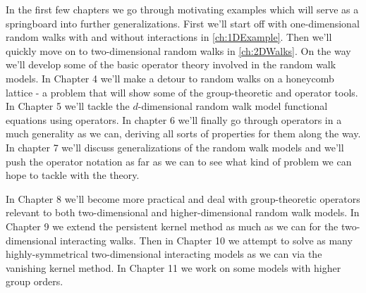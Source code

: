 In the first few chapters we go through motivating examples which will serve as a springboard into further generalizations. First we'll start off with one-dimensional random walks with and without interactions in \autoref{ch:1DExample}. Then we'll quickly move on to two-dimensional random walks in \autoref{ch:2DWalks}. On the way we'll develop some of the basic operator theory involved in the random walk models. In Chapter 4 we'll make a detour to random walks on a honeycomb lattice - a problem that will show some of the group-theoretic and operator tools. In Chapter 5 we'll tackle the $d$-dimensional random walk model functional equations using operators. In chapter 6 we'll finally go through operators in a much generality as we can, deriving all sorts of properties for them along the way. In chapter 7 we'll discuss generalizations of the random walk models and we'll push the operator notation as far as we can to see what kind of problem we can hope to tackle with the theory.

In Chapter 8 we'll become more practical and deal with group-theoretic operators relevant to both two-dimensional and higher-dimensional random walk models. In Chapter 9 we extend the persistent kernel method as much as we can for the two-dimensional interacting walks. Then in Chapter 10 we attempt to solve as many highly-symmetrical two-dimensional interacting models as we can via the vanishing kernel method. In Chapter 11 we work on some models with higher group orders.


\endinput


